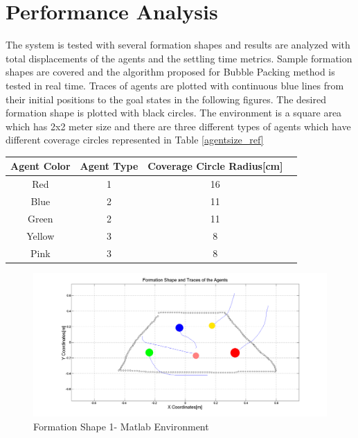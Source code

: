 \section{Performance Analysis}
The system is tested with several formation shapes and results are analyzed with total displacements of the agents and the settling time metrics. Sample formation shapes are covered  and the algorithm proposed for Bubble Packing method is tested in real time.  Traces of agents are plotted with continuous blue lines from their initial positions to the goal states in the following figures. The desired formation shape is plotted with black circles. The environment is a square area which has 2x2 meter size and there are three different types of agents which have different coverage circles represented in Table \ref{agentsize_ref}

\begin{center}
 \label{agentsize_ref} 
\begin{tabular}{|c| c |c |c ||}
\hline
Agent Color  & Agent Type & Coverage Circle Radius[cm]\\ 
\hline
Red & 1 & 16 \\
Blue & 2 & 11 \\
Green & 2 & 11 \\
Yellow & 3 & 8 \\
Pink & 3 & 8 \\
\hline
\end{tabular}
\end{center}
		
\begin{figure}[H]
\caption{Formation Shape 1- Matlab Environment} \label{hardhard1}
\centerline{\includegraphics[scale = 0.32]{2_hardware}}
\end{figure} 
			
